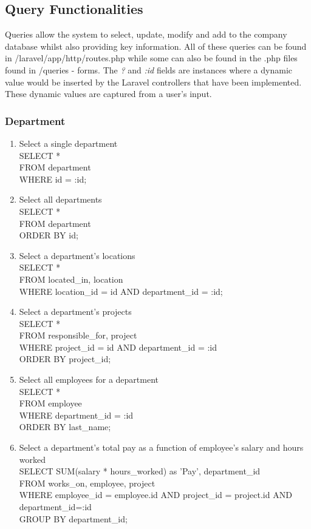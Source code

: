 \documentclass[11pt,letterpaper]{article}
\begin{document}
\subsection{Query Functionalities}
	Queries allow the system to select, update, modify and add to the company database whilst also providing key information. All of these queries can be found in /laravel/app/http/routes.php while some can also be found in the .php files found in /queries - forms. The \textit{?} and \textit{:id} fields are instances where a dynamic value would be inserted by the Laravel controllers that have been implemented. These dynamic values are captured from a user's input.
	\subsubsection{Department}
	\begin{enumerate}
		\item Select a single department\\ SELECT * \\FROM department \\WHERE id = :id;
		\item Select all departments \\SELECT * \\FROM department \\ORDER BY id;
		\item Select a department's locations\\SELECT * \\FROM located\_in, location \\ WHERE location\_id = id AND department\_id = :id;
		\item Select a department's projects \\SELECT *\\ FROM responsible\_for, project \\WHERE project\_id = id AND department\_id = :id\\ ORDER BY project\_id;
		\item Select all employees for a department \\SELECT * \\FROM employee \\WHERE department\_id = :id \\ORDER BY last\_name;
		\item Select a department's total pay as a function of employee's salary and hours worked\\SELECT SUM(salary * hours\_worked) as 'Pay', department\_id \\FROM works\_on, employee, project \\WHERE employee\_id = employee.id AND project\_id = project.id AND department\_id=:id \\GROUP BY department\_id;

\end{enumerate}
\end{document}

